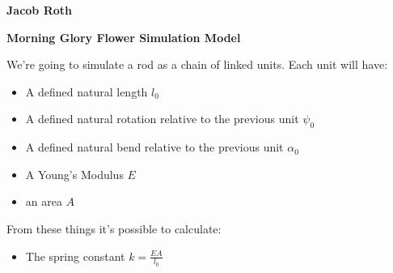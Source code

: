 \documentclass{letter}
\begin{document}
\textbf{Jacob Roth}

\textbf{Morning Glory Flower Simulation Model}
\bigskip

We're going to simulate a rod as a chain of linked units. Each unit will have:
\begin{itemize}
	\item A defined natural length $l_0$
	\item A defined natural rotation relative to the previous unit $\psi_0$
	\item A defined natural bend relative to the previous unit $\alpha_0$
	\item A Young's Modulus $E$
	\item an area $A$
\end{itemize}

From these things it's possible to calculate:
\begin{itemize}
	\item The spring constant $k = \frac{EA}{l_0}$
\end{itemize}
\end{document}
